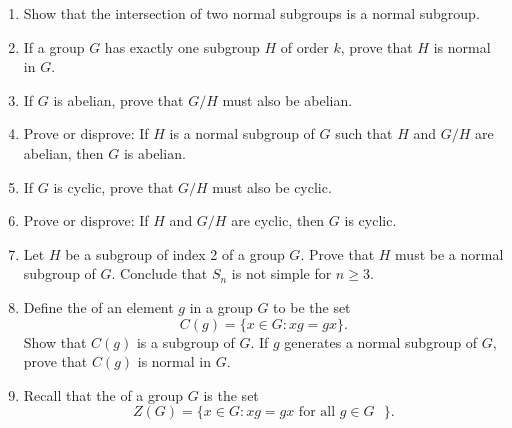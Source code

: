{{\begin{enumerate}
\begin{enumerate}
 \item 
Show that $U$ is a subgroup of $T$.
 
 \item 
Prove that $U$ is abelian.
 
 \item 
Prove that $U$ is normal in $T$.
 
 \item  
Show that $T/U$ is abelian.
 
 \item
Is $T$ normal in $GL_2( {\mathbb R})$?
 
\end{enumerate}


\item
Show that the intersection of two normal subgroups is a normal
subgroup. 

\item
If a group $G$ has exactly one subgroup $H$ of order $k$, prove that
$H$ is normal in $G$. 

\item
If $G$ is abelian, prove that $G/H$ must also be abelian.
 
\item
Prove or disprove: If $H$ is a normal subgroup of $G$ such that $H$
and $G/H$ are abelian, then $G$ is abelian. 
 
 

\item
If $G$ is cyclic, prove that $G/H$ must also be cyclic.


\item
Prove or disprove: If $H$ and $G/H$ are cyclic, then $G$ is cyclic.
 
 
\item
Let $H$ be a subgroup of index 2 of a group $G$. Prove that $H$ must
be a normal subgroup of $G$. Conclude that $S_n$ is not simple for $n \geq 3$.



\item
Define the  of an element $g$ in a group $G$
to be the set  
\[
C(g) = \{ x \in G : xg = gx \}.
\]
Show that $C(g)$ is a subgroup of $G$.  If $g$ generates a normal
subgroup of $G$, prove that $C(g)$ is normal in $G$.
 
 
\item
Recall that the  of a group $G$ is
the set 
\[
Z(G) = \{ x \in G : xg = gx \mbox{ for all $g \in G$ } \}.
\]
\begin{enumerate}
 

\end{enumerate}
\end{enumerate}}}
